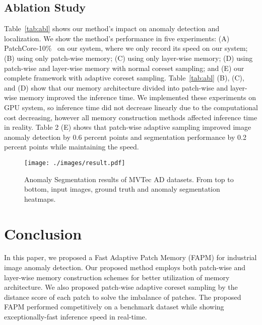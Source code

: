 \documentclass{article}
\begin{document}
 \vspace{-0.4cm}
	\subsection{Ablation Study}
	\label{ablation}
 \vspace{-0.2cm}
 Table~\ref{tab:abl} shows our method’s impact on anomaly detection and localization. We show the method’s performance in five experiments: (A) PatchCore-10\%~\cite{patchcore} on our system, where we only record its speed on our system; (B) using only patch-wise memory; (C) using only layer-wise memory; (D) using patch-wise and layer-wise memory with normal coreset sampling; and (E) our complete framework with adaptive coreset sampling. Table~\ref{tab:abl} (B), (C), and (D) show that our memory architecture divided into patch-wise and layer-wise memory improved the inference time. We implemented these experiments on GPU system, so inference time did not decrease linearly due to the computational cost decreasing, however all memory construction methods affected inference time in reality. Table 2 (E) shows that patch-wise adaptive sampling improved image anomaly detection by 0.6 percent points and segmentation performance by 0.2 percent points while maintaining the speed.

    \begin{figure}[t]
	\centering
	\texttt{[image: ./images/result.pdf]}
	\vspace{-0.45cm}
	\caption{Anomaly Segmentation results of MVTec AD datasets. From top to bottom, input images, ground truth and anomaly segmentation heatmaps.}
    \vspace{-0.1cm}
	\label{anomaly_seg}
    \end{figure}
    



\vspace{-0.5cm}
	\section{Conclusion}
	\vspace{-0.3cm}
	In this paper, we proposed a Fast Adaptive Patch Memory (FAPM) for industrial image anomaly detection. Our proposed method employs both patch-wise and layer-wise memory construction schemes for better utilization of memory architecture. We also proposed patch-wise adaptive coreset sampling by the distance score of each patch to solve the imbalance of patches. The proposed FAPM performed competitively on a benchmark dataset while showing exceptionally-fast inference speed in real-time.


\newpage
\newpage
\begingroup
{}


\endgroup
\end{document}
